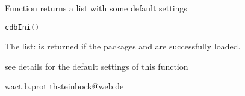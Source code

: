 \begin{Description}\relax
Function returns a list with some default settings
\end{Description}
\begin{Usage}
\begin{verbatim}
cdbIni()
\end{verbatim}
\end{Usage}
\begin{Details}\relax
The list:
 is returned if the packages  and
 are successfully loaded.
\end{Details}
\begin{Value}
\begin{ldescription}
\item[\code{cdb}] see details for the default settings of this function

\end{ldescription}
\end{Value}
\begin{Author}\relax
wact.b.prot
thsteinbock@web.de
\end{Author}
\begin{Examples}
\end{Examples}


